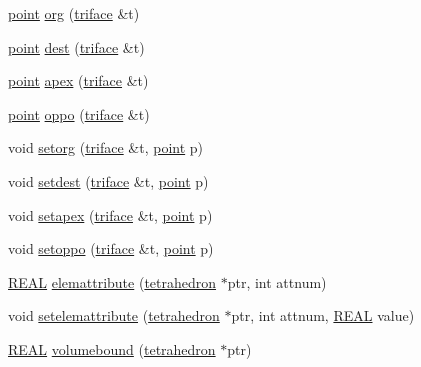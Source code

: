 \begin{DoxyCompactItemize}
\item 
\hyperlink{classtetgenmesh_ace3fb4f80389185b7c9b18ab69a3dea2}{point} \hyperlink{classtetgenmesh_ae2d4d27d7babd7b0e60956cc00bca89a}{org} (\hyperlink{classtetgenmesh_1_1triface}{triface} \&t)
\item 
\hyperlink{classtetgenmesh_ace3fb4f80389185b7c9b18ab69a3dea2}{point} \hyperlink{classtetgenmesh_ad56ef3448cd57e637acf373622bfb769}{dest} (\hyperlink{classtetgenmesh_1_1triface}{triface} \&t)
\item 
\hyperlink{classtetgenmesh_ace3fb4f80389185b7c9b18ab69a3dea2}{point} \hyperlink{classtetgenmesh_a9287d941f7f432ca846d5c004603af40}{apex} (\hyperlink{classtetgenmesh_1_1triface}{triface} \&t)
\item 
\hyperlink{classtetgenmesh_ace3fb4f80389185b7c9b18ab69a3dea2}{point} \hyperlink{classtetgenmesh_a2ff33d38976a7bc134380ef8f15c4519}{oppo} (\hyperlink{classtetgenmesh_1_1triface}{triface} \&t)
\item 
void \hyperlink{classtetgenmesh_a6ae234588aff3334e96cd1798d6e3129}{setorg} (\hyperlink{classtetgenmesh_1_1triface}{triface} \&t, \hyperlink{classtetgenmesh_ace3fb4f80389185b7c9b18ab69a3dea2}{point} p)
\item 
void \hyperlink{classtetgenmesh_a0fe745e12c7d0ce253a8d4486992ed7e}{setdest} (\hyperlink{classtetgenmesh_1_1triface}{triface} \&t, \hyperlink{classtetgenmesh_ace3fb4f80389185b7c9b18ab69a3dea2}{point} p)
\item 
void \hyperlink{classtetgenmesh_a0f00b784db4aba3d5d3f7c7b09ed12dc}{setapex} (\hyperlink{classtetgenmesh_1_1triface}{triface} \&t, \hyperlink{classtetgenmesh_ace3fb4f80389185b7c9b18ab69a3dea2}{point} p)
\item 
void \hyperlink{classtetgenmesh_abb76d76639d4f8cedc41c86d6fa2f180}{setoppo} (\hyperlink{classtetgenmesh_1_1triface}{triface} \&t, \hyperlink{classtetgenmesh_ace3fb4f80389185b7c9b18ab69a3dea2}{point} p)
\item 
\hyperlink{tetgen_8h_a4b654506f18b8bfd61ad2a29a7e38c25}{R\-E\-A\-L} \hyperlink{classtetgenmesh_abffbd551714f2e119e0f8ba3e4e54c92}{elemattribute} (\hyperlink{classtetgenmesh_a6a12b1c0d1834ca941d16c62e949e5e3}{tetrahedron} $\ast$ptr, int attnum)
\item 
void \hyperlink{classtetgenmesh_a0a648fdfb850a6d706e96bf62a18f761}{setelemattribute} (\hyperlink{classtetgenmesh_a6a12b1c0d1834ca941d16c62e949e5e3}{tetrahedron} $\ast$ptr, int attnum, \hyperlink{tetgen_8h_a4b654506f18b8bfd61ad2a29a7e38c25}{R\-E\-A\-L} value)
\item 
\hyperlink{tetgen_8h_a4b654506f18b8bfd61ad2a29a7e38c25}{R\-E\-A\-L} \hyperlink{classtetgenmesh_acbf906f467a4da46e7f89812cef268d7}{volumebound} (\hyperlink{classtetgenmesh_a6a12b1c0d1834ca941d16c62e949e5e3}{tetrahedron} $\ast$ptr)

\end{DoxyCompactItemize}
